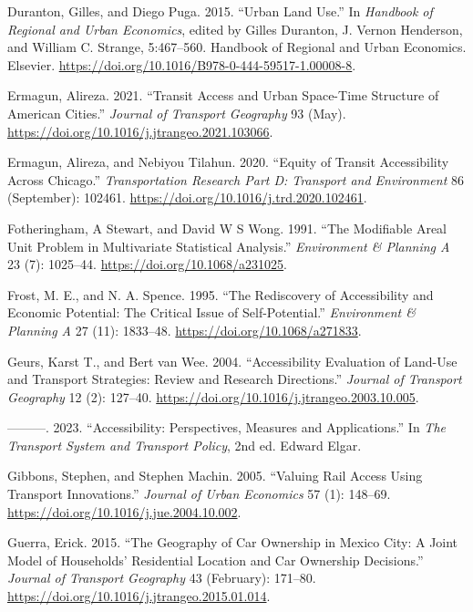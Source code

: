 \documentclass{article}
\newlength{\cslhangindent}
\newenvironment{CSLReferences}[2] %
 {\begin{list}{}{%
  \setlength{\itemindent}{0pt}
  \setlength{\leftmargin}{0pt}
  \setlength{\parsep}{0pt}
  \ifodd #1
   \setlength{\leftmargin}{\cslhangindent}
   \setlength{\itemindent}{-1\cslhangindent}
  \fi
  \setlength{\itemsep}{#2\baselineskip}}}
 {\end{list}}
\begin{document}
\begin{CSLReferences}{1}{0}
Duranton, Gilles, and Diego Puga. 2015. {``Urban {Land Use}.''} In
\emph{Handbook of {Regional} and {Urban Economics}}, edited by Gilles
Duranton, J. Vernon Henderson, and William C. Strange, 5:467--560.
Handbook of {Regional} and {Urban Economics}. Elsevier.
\url{https://doi.org/10.1016/B978-0-444-59517-1.00008-8}.

Ermagun, Alireza. 2021. {``Transit Access and Urban Space-Time Structure
of {American} Cities.''} \emph{Journal of Transport Geography} 93 (May).
\url{https://doi.org/10.1016/j.jtrangeo.2021.103066}.

Ermagun, Alireza, and Nebiyou Tilahun. 2020. {``Equity of Transit
Accessibility Across {Chicago}.''} \emph{Transportation Research Part D:
Transport and Environment} 86 (September): 102461.
\url{https://doi.org/10.1016/j.trd.2020.102461}.

Fotheringham, A Stewart, and David W S Wong. 1991. {``The Modifiable
Areal Unit Problem in Multivariate Statistical Analysis.''}
\emph{Environment \& Planning A} 23 (7): 1025--44.
\url{https://doi.org/10.1068/a231025}.

Frost, M. E., and N. A. Spence. 1995. {``The Rediscovery of
Accessibility and Economic Potential: The Critical Issue of
Self-Potential.''} \emph{Environment \& Planning A} 27 (11): 1833--48.
\url{https://doi.org/10.1068/a271833}.

Geurs, Karst T., and Bert van Wee. 2004. {``Accessibility Evaluation of
Land-Use and Transport Strategies: {Review} and Research Directions.''}
\emph{Journal of Transport Geography} 12 (2): 127--40.
\url{https://doi.org/10.1016/j.jtrangeo.2003.10.005}.

---------. 2023. {``Accessibility: Perspectives, Measures and
Applications.''} In \emph{The {Transport System} and {Transport
Policy}}, 2nd ed. Edward Elgar.

Gibbons, Stephen, and Stephen Machin. 2005. {``Valuing Rail Access Using
Transport Innovations.''} \emph{Journal of Urban Economics} 57 (1):
148--69. \url{https://doi.org/10.1016/j.jue.2004.10.002}.

Guerra, Erick. 2015. {``The Geography of Car Ownership in {Mexico City}:
A Joint Model of Households' Residential Location and Car Ownership
Decisions.''} \emph{Journal of Transport Geography} 43 (February):
171--80. \url{https://doi.org/10.1016/j.jtrangeo.2015.01.014}.


\end{CSLReferences}
\end{document}
